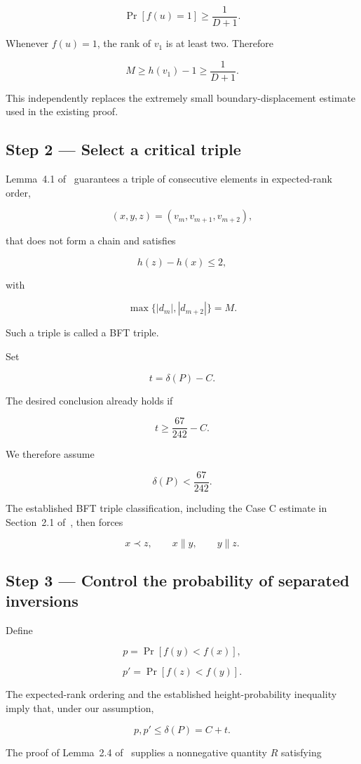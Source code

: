 \documentclass[11pt]{article}
\begin{document}
\[
\Pr[f(u)=1]\geq\frac1{D+1}.
\]

Whenever \(f(u)=1\), the rank of \(v_1\) is at least two. Therefore

\[
\boxed{
M\geq h(v_1)-1\geq\frac1{D+1}.
}
\]

This independently replaces the extremely small boundary-displacement estimate used in the existing proof.

\subsection{Step 2 --- Select a critical triple}

Lemma~4.1 of~\cite{ACPP} guarantees a triple of consecutive elements in expected-rank order,

\[
(x,y,z)=(v_m,v_{m+1},v_{m+2}),
\]

that does not form a chain and satisfies

\[
h(z)-h(x)\leq2,
\]

with

\[
\max\{|d_m|,|d_{m+2}|\}=M.
\]

Such a triple is called a BFT triple.

Set

\[
t=\delta(P)-C.
\]

The desired conclusion already holds if

\[
t\geq\frac{67}{242}-C.
\]

We therefore assume

\[
\delta(P)<\frac{67}{242}.
\]

The established BFT triple classification, including the Case C estimate in Section~2.1 of~\cite{ACPP}, then forces

\[
x\prec z,\qquad x\parallel y,\qquad y\parallel z.
\]

\subsection{Step 3 --- Control the probability of separated inversions}

Define

\[
p=\Pr[f(y)<f(x)],
\]

\[
p'=\Pr[f(z)<f(y)].
\]

The expected-rank ordering and the established height-probability inequality imply that, under our assumption,

\[
p,p'\leq\delta(P)=C+t.
\]

The proof of Lemma~2.4 of~\cite{ACPP} supplies a nonnegative quantity \(R\) satisfying
\end{document}
